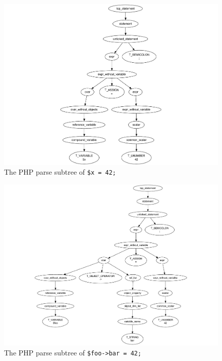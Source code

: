 \begin{figure}[htb]
  \begin{center}
    \includegraphics[scale=.7, trim=30mm 0mm 0mm 0mm]{images/simple-variable-assignment}
    \caption{The PHP parse subtree of \texttt{\$x = 42;}}
    \label{fig:simple-variable-assignment}
  \end{center}
\end{figure}

\begin{figure}[htb]
  \begin{center}
    \includegraphics[scale=.73, trim=40mm 0mm 0mm 0mm]{images/one-level-field-access-left}
    \caption{The PHP parse subtree of \texttt{\$foo->bar = 42;}}
    \label{fig:one-level-field-access-left}
  \end{center}
\end{figure}

